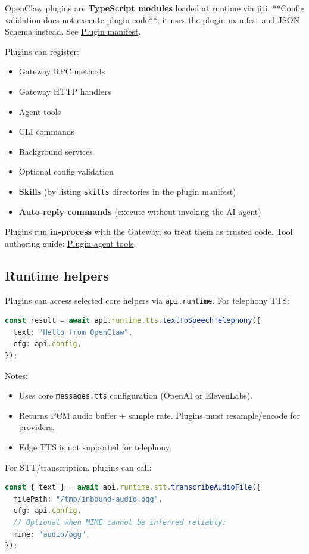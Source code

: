 OpenClaw plugins are \textbf{TypeScript modules} loaded at runtime via jiti. **Config
validation does not execute plugin code**; it uses the plugin manifest and JSON
Schema instead. See \href{/plugins/manifest}{Plugin manifest}.

Plugins can register:

\begin{itemize}
  \item Gateway RPC methods
  \item Gateway HTTP handlers
  \item Agent tools
  \item CLI commands
  \item Background services
  \item Optional config validation
  \item \textbf{Skills} (by listing \texttt{skills} directories in the plugin manifest)
  \item \textbf{Auto-reply commands} (execute without invoking the AI agent)
\end{itemize}


Plugins run \textbf{in‑process} with the Gateway, so treat them as trusted code.
Tool authoring guide: \href{/plugins/agent-tools}{Plugin agent tools}.

\subsection{Runtime helpers}


Plugins can access selected core helpers via \texttt{api.runtime}. For telephony TTS:

\begin{lstlisting}[language=typescript]
const result = await api.runtime.tts.textToSpeechTelephony({
  text: "Hello from OpenClaw",
  cfg: api.config,
});
\end{lstlisting}


Notes:

\begin{itemize}
  \item Uses core \texttt{messages.tts} configuration (OpenAI or ElevenLabs).
  \item Returns PCM audio buffer + sample rate. Plugins must resample/encode for providers.
  \item Edge TTS is not supported for telephony.
\end{itemize}


For STT/transcription, plugins can call:

\begin{lstlisting}[language=typescript]
const { text } = await api.runtime.stt.transcribeAudioFile({
  filePath: "/tmp/inbound-audio.ogg",
  cfg: api.config,
  // Optional when MIME cannot be inferred reliably:
  mime: "audio/ogg",
});
\end{lstlisting}


